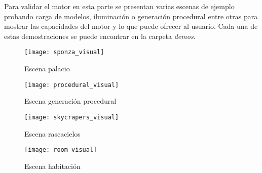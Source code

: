 Para validar el motor en esta parte se presentan varias escenas de ejemplo probando carga de modelos, iluminación o
generación procedural entre otras para mostrar las capacidades del motor y lo que puede ofrecer al usuario.
Cada una de estas demostraciones se puede encontrar en la carpeta \textit{demos}.

\begin{figure}[h!]
    \centering
    \begin{minipage}[c]{.5\textwidth}
        \texttt{[image: sponza\_visual]}
        \caption{Escena palacio}
        \label{sponza_visual}
    \end{minipage}%
    \begin{minipage}[c]{.5\textwidth}
        \texttt{[image: procedural\_visual]}
        \caption{Escena generación procedural}
        \label{procedural_visual}
    \end{minipage}%
\end{figure}
\begin{figure}[h!]
    \centering
    \begin{minipage}[c]{.5\textwidth}
        \texttt{[image: skycrapers\_visual]}
        \caption{Escena rascacielos}
        \label{skycrapers_visual}
    \end{minipage}%
    \begin{minipage}[c]{.5\textwidth}
        \texttt{[image: room\_visual]}
        \caption{Escena habitación}
        \label{room_visual}
    \end{minipage}%
\end{figure}

\emptyPage